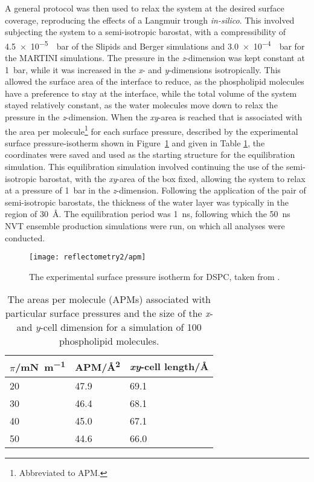 A general protocol was then used to relax the system at the desired surface coverage, reproducing the effects of a Langmuir trough \emph{in-silico}.
This involved subjecting the system to a semi-isotropic barostat, with a compressibility of \SI{4.5e-5}{\per\bar} of the Slipids and Berger simulations and \SI{3.0e-4}{\per\bar} for the MARTINI simulations.
The pressure in the \emph{z}-dimension was kept constant at \SI{1}{\bar}, while it was increased in the \emph{x}- and \emph{y}-dimensions isotropically.
This allowed the surface area of the interface to reduce, as the phospholipid molecules have a preference to stay at the interface, while the total volume of the system stayed relatively constant, as the water molecules move down to relax the pressure in the \emph{z}-dimension.
When the \emph{xy}-area is reached that is associated with the area per molecule\footnote{Abbreviated to APM.} for each surface pressure, described by the experimental surface pressure-isotherm shown in Figure~\ref{fig:surfiso} and given in Table \ref{tab:apm}, the coordinates were saved and used as the starting structure for the equilibration simulation.
This equilibration simulation involved continuing the use of the semi-isotropic barostat, with the \emph{xy}-area of the box fixed, allowing the system to relax at a pressure of \SI{1}{\bar} in the \emph{z}-dimension.
Following the application of the pair of semi-isotropic barostats, the thickness of the water layer was typically in the region of \SI{30}{\angstrom}.
The equilibration period was \SI{1}{\nano\second}, following which the \SI{50}{\nano\second} NVT ensemble production simulations were run, on which all analyses were conducted.
%
\begin{figure}
    \centering
    \texttt{[image: reflectometry2/apm]}
    \caption{The experimental surface pressure isotherm for DSPC, taken from \cite{kubo_phosphatidylcholine_2001}.}
    \label{fig:surfiso}
\end{figure}
%
%
\begin{table}
    \centering
    \small
    \caption{The areas per molecule (APMs) associated with particular surface pressures and the size of the \emph{x}- and \emph{y}-cell dimension for a simulation of 100 phospholipid molecules.}
    \label{tab:apm}
    \begin{tabular}{l | l l}
        \toprule
        $\pi$/\si{\milli\newton\per\meter} & APM/\si{\angstrom\squared} & \emph{xy}-cell length/\si{\angstrom} \\
        \midrule
        \num{20} & \num{47.9} & \num{69.1} \\
        \num{30} & \num{46.4} & \num{68.1} \\
        \num{40} & \num{45.0} & \num{67.1} \\
        \num{50} & \num{44.6} & \num{66.0} \\
        \bottomrule
    \end{tabular}
\end{table}
%
